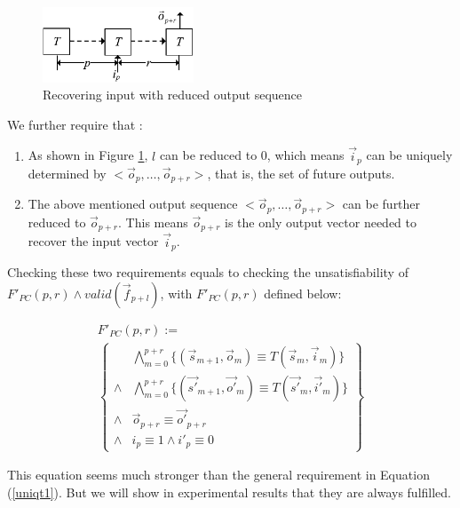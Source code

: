 \documentclass[conference]{IEEEtran}
\begin{document}
\begin{figure}[t]
\begin{center}
\includegraphics[width=0.4\textwidth]{pc1}
\end{center}
\caption{Recovering input with reduced output sequence}
  \label{fig_pc1}
\end{figure}

We further require that :
\begin{enumerate}
 \item As shown in Figure \ref{fig_pc1},
 $l$ can be reduced to 0,
 which means $\vec{i}_{p}$ can be uniquely determined by $<\vec{o}_{p},\dots,\vec{o}_{p+r}>$,
 that is,
 the set of future outputs.
 \item The above mentioned output sequence $<\vec{o}_{p},\dots,\vec{o}_{p+r}>$ 
 can be further reduced to $\vec{o}_{p+r}$.
 This means $\vec{o}_{p+r}$ is the only output vector needed to recover the input vector $\vec{i}_p$.
\end{enumerate}

Checking these two requirements
equals to checking the unsatisfiability of $F'_{PC}(p,r)\wedge valid(\vec{f}_{p+l})$,
with $F'_{PC}(p,r)$ defined below:

\begin{multline}\label{uniqt11}
F'_{PC}(p,r):=\\
\left\{
\begin{array}{cc}
&\bigwedge_{m=0}^{p+r}
\{
(\vec{s}_{m+1},\vec{o}_m)\equiv T(\vec{s}_m,\vec{i}_m)
\}
\\
\wedge&\bigwedge_{m=0}^{p+r}
\{
(\vec{s'}_{m+1},\vec{o'}_m)\equiv T(\vec{s'}_m,\vec{i'}_m)
\}
\\
\wedge&\vec{o}_{p+r}\equiv \vec{o'}_{p+r} \\
\wedge& i_{p}\equiv 1 \wedge  i'_{p}\equiv 0 
\end{array}
\right\}
\end{multline}


This equation seems much stronger than the general requirement in Equation (\ref{uniqt1}).
But we will show in experimental results that 
they are always fulfilled.
\end{document}
